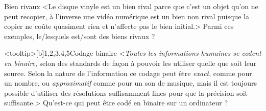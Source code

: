 \begin{quiz}[title={Données et traitements}]
\begin{quizquestion}[b]{1}{2}{Bien rivaux}
<Le disque vinyle est un bien rival parce que c'est un objet qu'on ne peut recopier, à l'inverse une vidéo numérique est un bien non rival puisque la copier ne coûte quasiment rien et n'affecte pas le bien initial.>
Parmi ces exemples, le/lesquels est/sont des biens rivaux ?
\end{quizquestion}

\begin{quizquestion}<tooltip>[b]{1,2,3,4,5}{}{Codage binaire}
<\textit{Toutes les informations humaines se codent en binaire}, selon des standards de façon à pouvoir les utiliser quelle que soit leur source. Selon la nature de l'information ce codage peut être \textit{exact}, comme pour un nombre, ou \textit{approximatif} comme pour un son de musique, mais il est toujours possible d'utiliser des résolutions suffisamment fines pour que la précision soit suffisante.>
Qu’est-ce qui peut être codé en binaire sur un ordinateur ?
\end{quizquestion}


\end{quiz}
